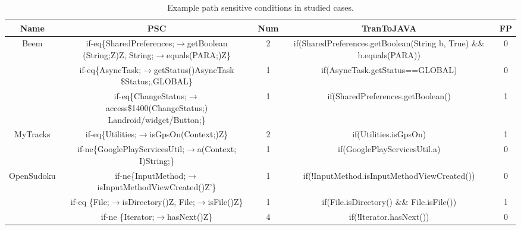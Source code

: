 \begin{table*}[!t]
\centering
\begin{threeparttable}[b]
\caption{Example path sensitive conditions in studied cases. } 
\newcommand{\tabincell}[2]{\begin{tabular}{@{}#1@{}}#2\end{tabular}}
\footnotesize

\begin{tabular}{|c|c|c|c|c|}
\hline 
Name &  PSC & Num & TranToJAVA & FP\\
\hline 
\hline 
\multirow{6}{*}{Beem }& \multirow{2}{6.3cm}{if-eq\{SharedPreferences;$\rightarrow$getBoolean (String;Z)Z, 
String;$\rightarrow$equals(PARA;)Z\} } & \multirow{2}{*}{2} & \multirow{2}{4cm}{if(SharedPreferences.getBoolean(String b, True) \&\& b.equals(PARA))} & \multirow{2}{*}{0}\\
&&&&\\
\cline{2-5}
 & \multirow{2}{6.3cm}{if-eq\{AsyncTask;$\rightarrow$getStatus()AsyncTask \$Status;,GLOBAL\}}  &\multirow{2}{*}{1} & \multirow{2}{*}{if(AsyncTask.getStatus==GLOBAL)}& \multirow{2}{*}{0}\\

&&&&\\
 \cline{2-5}
  & \multirow{2}{6.3cm}{if-eq\{ChangeStatus;$\rightarrow$access\$1400(ChangeStatus;) Landroid/widget/Button;\}}  & \multirow{2}{*}{1} & \multirow{2}{*}{if(SharedPreferences.getBoolean()}& \multirow{2}{*}{1}\\
  &&&&\\
\hline 
\multirow{2}{*}{MyTracks}  &if-eq\{Utilities;$\rightarrow$isGpsOn(Context;)Z\} & 2 &if(Utilities.isGpsOn) & 1\\
\cline{2-5} 
 &if-ne\{GooglePlayServicesUtil;$\rightarrow$a(Context; I)String;\} & 1 & if(GooglePlayServicesUtil.a) & 0\\
\hline 
\multirow{3}{*}{OpenSudoku}  & if-ne\{InputMethod;$\rightarrow$isInputMethodViewCreated()Z'\}  & 1& if(!InputMethod.isInputMethodViewCreated())& 0\\
\cline{2-5}
  & if-eq \{File;$\rightarrow$isDirectory()Z, File;$\rightarrow$isFile()Z\} &1& if(File.isDirectory() \&\& File.isFile()) & 1\\
\cline{2-5}
   & if-ne \{Iterator;$\rightarrow$hasNext()Z\}& 4& if(!Iterator.hasNext())  & 0\\
\hline 
\end{tabular}
\label{tb2: experiment2}  
\end{threeparttable}
\end{table*}

